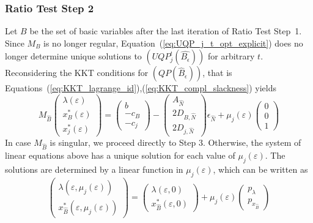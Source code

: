 \documentclass[a4paper]{article}
\begin{document}
\subsubsection{Ratio Test Step 2}
Let $B$ be the set of basic variables after the last iteration of 
Ratio Test Step~1. Since
$M_{B}$ is no longer regular, Equation~(\ref{eq:UQP_j_t_opt_explicit}) does
no longer
determine unique solutions to $(UQP_{j}^{t}(\hat{B_{\epsilon}}))$ for arbitrary
$t$.
Reconsidering the KKT conditions for $(QP(\hat{B}_{\epsilon}))$, that is
Equations~(\ref{eq:KKT_lagrange_id}),(\ref{eq:KKT_compl_slackness}) yields
\begin{equation}
\label{eq:QP_j_mu_opt_explicit}
M_{\hat{B}}
\left(\begin{array}{c}
         \lambda\left(\varepsilon\right) \\
	 \hline
	 x_{B}^{*}\left(\varepsilon\right) \\
	 \hline
	 x_{j}^{*}\left(\varepsilon\right)
       \end{array}
\right)
=
\left(\begin{array}{c}
        b  \\
	\hline
	-c_{B} \\
	\hline
	-c_{j}
       \end{array}
\right)
-
\left(\begin{array}{c}
        A_{\hat{N}} \\
	\hline
	2D_{B, \hat{N}} \\
	\hline
	2D_{j, \hat{N}}
       \end{array}
\right)\epsilon_{\hat{N}}
+ \mu_{j}\left(\varepsilon\right)
\left(\begin{array}{c}
        0 \\
	\hline
	0 \\
	\hline
	1
       \end{array}
\right)
\end{equation}
In case $M_{\hat{B}}$ is singular, we proceed directly to Step 3. Otherwise,
the system of linear equations above has a unique solution for each value of
$\mu_{j}\left(\varepsilon\right)$. The solutions are determined by a linear
function in $\mu_{j}\left(\varepsilon\right)$, which can be written as
\begin{equation}
\label{eq:QP_j_mu_opt_short}
\left(\begin{array}{c}
         \lambda\left(\varepsilon, \mu_{j}\left(\varepsilon\right)\right) \\
	 \hline
	 x_{\hat{B}}^{*}\left(\varepsilon, 
	   \mu_{j}\left(\varepsilon\right)\right)
       \end{array}
\right)
=
\left(\begin{array}{c}
        \lambda\left(\varepsilon, 0\right) \\
	\hline
	x_{\hat{B}}^{*}\left(\varepsilon, 0\right)
       \end{array}
\right)
+ \mu_{j}(\varepsilon)
\left(\begin{array}{c}
         p_{\lambda} \\
	 \hline
	 p_{x_{\hat{B}}}
       \end{array}
\right)
\end{equation}
\end{document}
